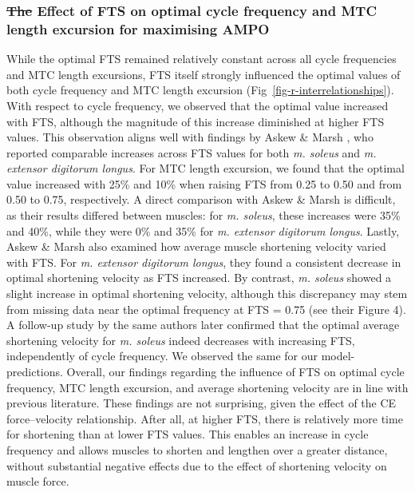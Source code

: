 \documentclass[
  10pt,
  letterpaper,
]{article}
\begin{document}
\subsubsection{\texorpdfstring{\st{The} Effect of FTS on optimal cycle
frequency and MTC length excursion for maximising
AMPO}{The Effect of FTS on optimal cycle frequency and MTC length excursion for maximising AMPO}}\label{the-effect-of-fts-on-optimal-cycle-frequency-and-mtc-length-excursion-for-maximising-ampo}

While the optimal FTS remained relatively constant across all cycle
frequencies and MTC length excursions, FTS itself strongly influenced
the optimal values of both cycle frequency and MTC length excursion
(Fig~\ref{fig-r-interrelationships}). With respect to cycle frequency,
we observed that the optimal value increased with FTS, although the
magnitude of this increase diminished at higher FTS values. This
observation aligns well with findings by {Askew \& Marsh
\citep{askew_effects_1997}}, who reported comparable increases across
FTS values for both \emph{m. soleus} and \emph{m. extensor digitorum
longus}. For MTC length excursion, we found that the optimal value
increased with 25\% and 10\% when raising FTS from 0.25 to 0.50 and from
0.50 to 0.75, respectively. A direct comparison with {Askew \& Marsh
\citep{askew_effects_1997}} is difficult, as their results differed
between muscles: for \emph{m. soleus}, these increases were 35\% and
40\%, while they were 0\% and 35\% for \emph{m. extensor digitorum
longus}. Lastly, {Askew \& Marsh \citep{askew_effects_1997}} also
examined how average muscle shortening velocity varied with FTS. For
\emph{m. extensor digitorum longus}, they found a consistent decrease in
optimal shortening velocity as FTS increased. By contrast, \emph{m.
soleus} showed a slight increase in optimal shortening velocity,
although this discrepancy may stem from missing data near the optimal
frequency at FTS = 0.75 (see their Figure 4). A follow-up study by the
same authors \citep{askew_optimal_1998} later confirmed that the optimal
average shortening velocity for \emph{m. soleus} indeed decreases with
increasing FTS, independently of cycle frequency. We observed the same
for our model-predictions. Overall, our findings regarding the influence
of FTS on optimal cycle frequency, MTC length excursion, and average
shortening velocity are in line with previous literature. These findings
are not surprising, given the effect of the CE force--velocity
relationship. After all, at higher FTS, there is relatively more time
for shortening than at lower FTS values. This enables an increase in
cycle frequency and allows muscles to shorten and lengthen over a
greater distance, without substantial negative effects due to the effect
of shortening velocity on muscle force.
\end{document}
